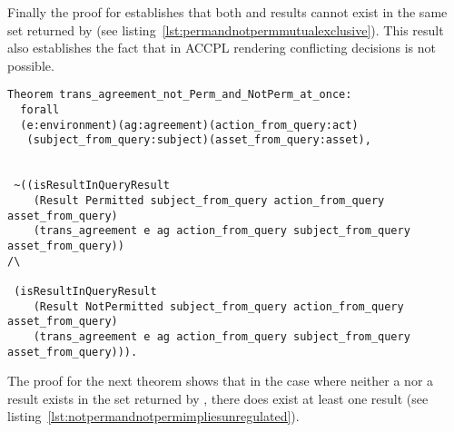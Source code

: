 Finally the proof for  establishes that both  and  results cannot exist in the same set returned by  (see listing~\ref{lst:permandnotpermmutualexclusive}). This result also establishes the fact that in \ac{ACCPL} rendering conflicting decisions is not possible. 

\begin{lstlisting}
Theorem trans_agreement_not_Perm_and_NotPerm_at_once:
  forall
  (e:environment)(ag:agreement)(action_from_query:act)
   (subject_from_query:subject)(asset_from_query:asset),


 ~((isResultInQueryResult 
    (Result Permitted subject_from_query action_from_query asset_from_query)
    (trans_agreement e ag action_from_query subject_from_query asset_from_query)) 
/\

 (isResultInQueryResult 
    (Result NotPermitted subject_from_query action_from_query asset_from_query)
    (trans_agreement e ag action_from_query subject_from_query asset_from_query))).

\end{lstlisting}

The proof for the next theorem  shows that in the case where neither a  nor a  result exists in the set returned by , there does exist at least one  result (see listing~\ref{lst:notpermandnotpermimpliesunregulated}).

